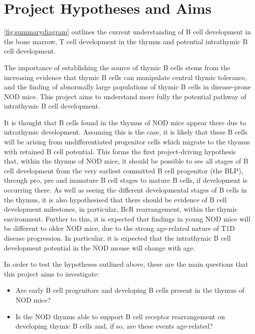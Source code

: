 \section{Project Hypotheses and Aims}

\cref{fig:summarydiagram} outlines the current understanding of B cell development in the bone marrow, T cell development in the thymus and potential intrathymic B cell development.

The importance of establishing the source of thymic B cells stems from the increasing evidence that thymic B cells can manipulate central thymic tolerance, and the finding of abnormally large populations of thymic B cells in disease-prone NOD mice.
This project aims to understand more fully the potential pathway of intrathymic B cell development.

It is thought that B cells found in the thymus of NOD mice appear there due to intrathymic development. 
Assuming this is the case, it is likely that these B cells will be arising from undifferentiated progenitor cells which migrate to the thymus with retained B cell potential.
This forms the first project-driving hypothesis that, within the thymus of NOD mice, it should be possible to see all stages of B cell development from the very earliest committed B cell progenitor (the BLP), through pro, pre and immature B cell stages to mature B cells, if development is occurring there.
As well as seeing the different developmental stages of B cells in the thymus, it is also hypothesised that there should be evidence of B cell development milestones, in particular, BcR rearrangement, within the thymic environment.
Further to this, it is expected that findings in young NOD mice will be different to older NOD mice, due to the strong age-related nature of T1D disease progression. In particular, it is expected that the intrathymic B cell development potential in the NOD mouse will change with age.

In order to test the hypotheses outlined above, these are the main questions that this project aims to investigate:
\begin{itemize}
\item Are early B cell progenitors and developing B cells present in the thymus of NOD mice?
\item Is the NOD thymus able to support B cell receptor rearrangement on developing thymic B cells and, if so, are these events age-related?
\end{itemize}

